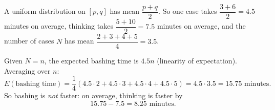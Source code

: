 A uniform distribution on $[p,q]$ has mean $\dfrac{p+q}{2}$. So one case takes $\dfrac{3+6}{2}=4.5$ minutes on average, thinking takes $\dfrac{5+10}{2}=7.5$ minutes on average, and the number of cases $N$ has mean $\dfrac{2+3+4+5}{4}=3.5$.

Given $N=n$, the expected bashing time is $4.5n$ (linearity of expectation). Averaging over $n$:
\[E(\text{bashing time})=\dfrac14\left(4.5\cdot2+4.5\cdot3+4.5\cdot4+4.5\cdot5\right)=4.5\cdot3.5=15.75\text{ minutes}.\]
So bashing is \emph{not} faster: on average, thinking is faster by
\[15.75-7.5=\boxed{8.25\text{ minutes}}.\]
